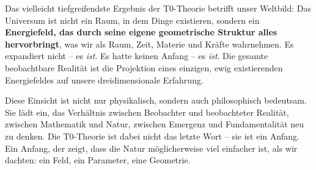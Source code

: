 \documentclass[11pt,oneside]{book}
\begin{document}
Das vielleicht tiefgreifendste Ergebnis der T0-Theorie betrifft unser Weltbild: Das Universum ist nicht ein Raum, in dem Dinge existieren, sondern ein \textbf{Energiefeld, das durch seine eigene geometrische Struktur alles hervorbringt}, was wir als Raum, Zeit, Materie und Kräfte wahrnehmen. Es expandiert nicht -- es \textit{ist}. Es hatte keinen Anfang -- es \textit{ist}. Die gesamte beobachtbare Realität ist die Projektion eines einzigen, ewig existierenden Energiefeldes auf unsere dreidimensionale Erfahrung.

Diese Einsicht ist nicht nur physikalisch, sondern auch philosophisch bedeutsam. Sie lädt ein, das Verhältnis zwischen Beobachter und beobachteter Realität, zwischen Mathematik und Natur, zwischen Emergenz und Fundamentalität neu zu denken. Die T0-Theorie ist dabei nicht das letzte Wort -- sie ist ein Anfang. Ein Anfang, der zeigt, dass die Natur möglicherweise viel einfacher ist, als wir dachten: ein Feld, ein Parameter, eine Geometrie.
\end{document}
